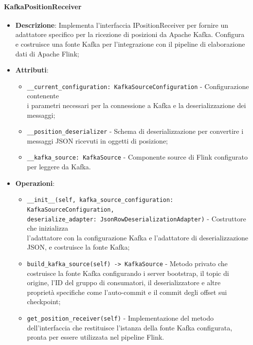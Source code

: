 \documentclass[10pt]{article}
\begin{document}
    \paragraph{KafkaPositionReceiver}
    \begin{itemize} 
    \item \textbf{Descrizione}: Implementa l'interfaccia IPositionReceiver per fornire un adattatore specifico per la ricezione di posizioni da Apache Kafka. Configura e costruisce una fonte Kafka per l'integrazione con il pipeline di elaborazione dati di Apache Flink;
    \item \textbf{Attributi}:
    \begin{itemize}
        \item \texttt{\_\_current\_configuration: KafkaSourceConfiguration} - Configurazione contenente\\ i parametri necessari per la connessione a Kafka e la deserializzazione dei messaggi;
        \item \texttt{\_\_position\_deserializer} - Schema di deserializzazione per convertire i messaggi JSON ricevuti in oggetti di posizione;
        \item \texttt{\_\_kafka\_source: KafkaSource} - Componente source di Flink configurato per leggere da Kafka.
    \end{itemize}
    
    \item \textbf{Operazioni}:
    \begin{itemize}
        \item \texttt{\_\_init\_\_(self, kafka\_source\_configuration: KafkaSourceConfiguration,\\ deserialize\_adapter: JsonRowDeserializationAdapter)} - Costruttore che inizializza\\ l'adattatore con la configurazione Kafka e l'adattatore di deserializzazione JSON, e costruisce la fonte Kafka;
        
        \item \texttt{build\_kafka\_source(self) -> KafkaSource} - Metodo privato che costruisce la fonte Kafka configurando i server bootstrap, il topic di origine, l'ID del gruppo di consumatori, il deserializzatore e altre proprietà specifiche come l'auto-commit e il commit degli offset sui checkpoint;
        
        \item \texttt{get\_position\_receiver(self)} - Implementazione del metodo dell'interfaccia che restituisce l'istanza della fonte Kafka configurata, pronta per essere utilizzata nel pipeline Flink.
    \end{itemize}
    \end{itemize}
\end{document}
